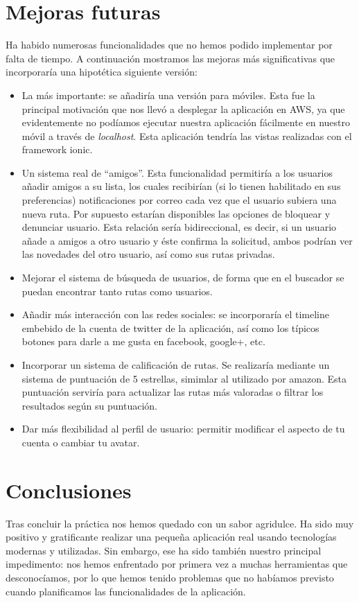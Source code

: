 \documentclass[11pt,a4paper]{article}
\begin{document}
\section{Mejoras futuras}
Ha habido numerosas funcionalidades que no hemos podido implementar por falta de tiempo. A continuación mostramos las mejoras más significativas que incorporaría una hipotética siguiente versión:
\begin{itemize}
\item La más importante: se añadiría una versión para móviles. Esta fue la principal motivación que nos llevó a desplegar la aplicación en AWS, ya que evidentemente no podíamos ejecutar nuestra aplicación fácilmente en nuestro móvil a través de \textit{localhost}. Esta aplicación tendría las vistas realizadas con el framework ionic.
\item Un sistema real de ``amigos''. Esta funcionalidad permitiría a los usuarios añadir amigos a su lista, los cuales recibirían (si lo tienen habilitado en sus preferencias) notificaciones por correo cada vez que el usuario subiera una nueva ruta. Por supuesto estarían disponibles las opciones de bloquear y denunciar usuario. Esta relación sería bidireccional, es decir, si un usuario añade a amigos a otro usuario y éste confirma la solicitud, ambos podrían ver las novedades del otro usuario, así como sus rutas privadas.
\item Mejorar el sistema de búsqueda de usuarios, de forma que en el buscador se puedan encontrar tanto rutas como usuarios.
\item Añadir más interacción con las redes sociales: se incorporaría el timeline embebido de la cuenta de twitter de la aplicación, así como los típicos botones para darle a me gusta en facebook, google+, etc.
\item Incorporar un sistema de calificación de rutas. Se realizaría mediante un sistema de puntuación de 5 estrellas, simimlar al utilizado por amazon. Esta puntuación serviría para actualizar las rutas más valoradas o filtrar los resultados según su puntuación.
\item Dar más flexibilidad al perfil de usuario: permitir modificar el aspecto de tu cuenta o cambiar tu avatar.
\end{itemize} 

\clearpage

\section{Conclusiones}
Tras concluir la práctica nos hemos quedado con un sabor agridulce. Ha sido muy positivo y gratificante realizar una pequeña aplicación real usando tecnologías modernas y utilizadas. Sin embargo, ese ha sido también nuestro principal impedimento: nos hemos enfrentado por primera vez a muchas herramientas que desconocíamos, por lo que hemos tenido problemas que no habíamos previsto cuando planificamos las funcionalidades de la aplicación. \\
\end{document}
